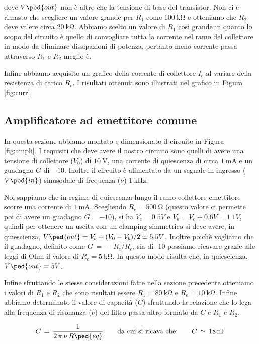 dove $V\ped{out}$ non è altro che la tensione di base del transistor.
Non ci è rimasto che scegliere un valore grande per $R_1$ come $\SI{100}{\kilo\ohm}$ e otteniamo che $R_2$ deve valere circa $\SI{20}{\kilo\ohm}$. Abbiamo scelto un valore di $R_1$ così grande in quanto lo scopo del circuito è quello di convogliare tutta la corrente nel ramo del collettore in modo da eliminare dissipazioni di potenza, pertanto meno corrente passa attraverso $R_1$ e $R_2$ meglio è.

Infine abbiamo acquisito un grafico della corrente di collettore $I_c$ al variare della resistenza di carico $R_c$. I risultati ottenuti sono illustrati nel grafico in Figura \ref{fig:curr}.

\subsection*{Amplificatore ad emettitore comune}

In questa sezione abbiamo montato e dimensionato il circuito in Figura \ref{fig:ampli}. I requisiti che deve avere il nostro circuito sono quelli di avere una tensione di collettore ($V_0$) di $\SI{10}{\volt}$, una corrente di quiescenza di circa $\SI{1}{\milli\ampere}$ e un guadagno $G$ di $-10$. Inoltre il circuito è alimentato da un segnale in ingresso ($V\ped{in}$) sinusodale di frequenza ($\nu$) $\SI{1}{\kilo\hertz}$.

Noi sappiamo che in regime di quiescenza lungo il ramo collettore-emettitore scorre una corrente di $\SI{1}{\milli\ampere}$. Scegliendo $R_e = \SI{500}{\ohm}$ (questo valore ci permette poi di avere un guadagno $G = -10$), si ha $V_e = 0.5 V$ e $V_b = V_e + 0.6 V  = 1.1 V$, quindi per ottenere un uscita con un clamping simmetrico si deve avere, in quiescienza, $V\ped{out} = V_b + (V_0 - V_b)/2 \simeq 5.5 V$.
Inoltre poichè vogliamo che il guadagno, definito come $G\,=\,-R_c/R_e$, sia di -10 possiamo ricavare grazie alle leggi di Ohm il valore di $R_c = \SI{5}{\kilo\ohm}$. In questo modo risulta che, in quiescienza, $V\ped{out} = 5 V$.

Infine sfruttando le stesse considerazioni fatte nella sezione precedente otteniamo i valori di $R_1$ e $R_2$ che sono risultati essere $R_1=\SI{80}{\kilo\ohm}$ e $R_e=\SI{10}{\kilo\ohm}$.
Infine abbiamo determinato il valore di capacità ($C$) sfruttando la relazione che lo lega alla frequenza di risonanza ($\nu$) del filtro passa-altro formato da $C$ e $R_1$ e $R_2$.

\begin{equation}
	C \,=\, \frac{1}{2\,\pi\,\nu\,R\ped{eq}} \qquad\text{da cui si ricava che:}\qquad C \,\simeq\,\SI{18}{\nano\farad}
\end{equation}


